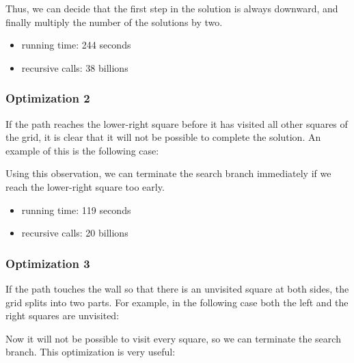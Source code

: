 Thus, we can decide that the first step
in the solution is always downward,
and finally multiply the number of the solutions by two.

\begin{itemize}
\item
running time: 244 seconds
\item
recursive calls: 38 billions
\end{itemize}

\subsubsection{Optimization 2}

If the path reaches the lower-right square
before it has visited all other squares of the grid,
it is clear that
it will not be possible to complete the solution.
An example of this is the following case:

\begin{center}
\end{center}
Using this observation, we can terminate the search branch
immediately if we reach the lower-right square too early.
\begin{itemize}
\item
running time: 119 seconds
\item
recursive calls: 20 billions
\end{itemize}

\subsubsection{Optimization 3}

If the path touches the wall so that there is
an unvisited square at both sides,
the grid splits into two parts.
For example, in the following case
both the left and the right squares
are unvisited:

\begin{center}
\end{center}
Now it will not be possible to visit every square,
so we can terminate the search branch.
This optimization is very useful:

